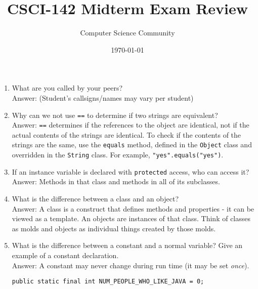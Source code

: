 \documentclass[11pt]{article}
\title{CSCI-142 Midterm Exam Review}
\author{Computer Science Community}
\date{\today}
\newenvironment{answer}{\large\lstset{basicstyle=\large}\color{white} \small{Answer:}\large}{}
\newenvironment{answer}{\large\lstset{basicstyle=\large}\color{red} \small{Answer:}\large}{}
\begin{document}
\header
\begin{enumerate}


\item What are you called by your peers? \\
\begin{answer}
(Student's callsigns/names may vary per student)
\end{answer}



\item Why can we not use {\tt ==} to determine if two strings are equivalent? \\
\begin{answer}
{\tt ==} determines if the references to the object are identical, not if the actual contents of the strings are identical.
To check if the contents of the strings are the same, use the {\tt equals} method, defined in the {\tt Object} class and overridden in the {\tt String} class.
For example, {\tt "yes".equals("yes")}.
\end{answer}



\item If an instance variable is declared with {\tt protected} access, who can access it? \\
\begin{answer}
Methods in that class and methods in all of its subclasses.
\end{answer}



\item What is the difference between a class and an object? \\
\begin{answer}
A class is a construct that defines methods and properties - it can be viewed as a template. An objects are instances of that class. Think of classes as molds and objects as individual things created by those molds.
\end{answer}



\item What is the difference between a constant and a normal variable? Give an example of a constant declaration. \\
\begin{answer}
A constant may never change during run time (it may be set {\em once}).
	\begin{lstlisting}
public static final int NUM_PEOPLE_WHO_LIKE_JAVA = 0;
	\end{lstlisting}
\end{answer}




\end{enumerate}
\end{document}
